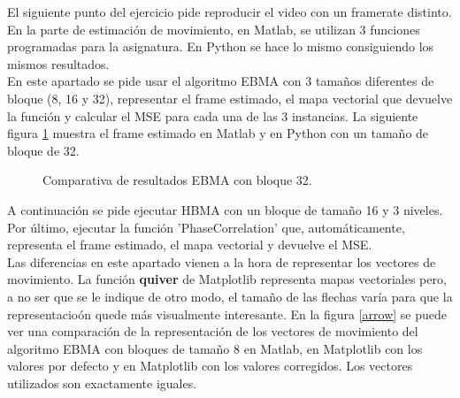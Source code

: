 \documentclass[a4paper,12pt]{report}
\begin{document}
El siguiente punto del ejercicio pide reproducir el video con un framerate distinto.\\

En la parte de estimación de movimiento, en Matlab, se utilizan 3 funciones programadas para la asignatura. En Python se hace lo mismo consiguiendo los mismos resultados. \\

En este apartado se pide usar el algoritmo EBMA con 3 tamaños diferentes de bloque (8, 16 y 32), representar el frame estimado, el mapa vectorial que devuelve la función y calcular el MSE para cada una de las 3 instancias. La siguiente figura \ref{ebma32} muestra el frame estimado en Matlab y en Python con un tamaño de bloque de 32.\\

\begin{figure}[!tbp]
  \centering
  \hfill
  \caption{Comparativa de resultados EBMA con bloque 32.}
  \label{ebma32}
\end{figure}
A continuación se pide ejecutar HBMA con un bloque de tamaño 16 y 3 niveles.\\

Por último, ejecutar la función 'PhaseCorrelation' que, automáticamente, representa el frame estimado, el mapa vectorial y devuelve el MSE.\\

Las diferencias en este apartado vienen a la hora de representar los vectores de movimiento. La función \textbf{quiver} de Matplotlib representa mapas vectoriales pero, a no ser que se le indique de otro modo, el tamaño de las flechas varía para que la representacioón quede más visualmente interesante. En la figura \ref{arrow} se puede ver una comparación de la representación  de los vectores de movimiento del algoritmo EBMA con bloques de tamaño 8 en Matlab, en Matplotlib con los valores por defecto y en Matplotlib con los valores corregidos. Los vectores utilizados son exactamente iguales.\\
\end{document}
